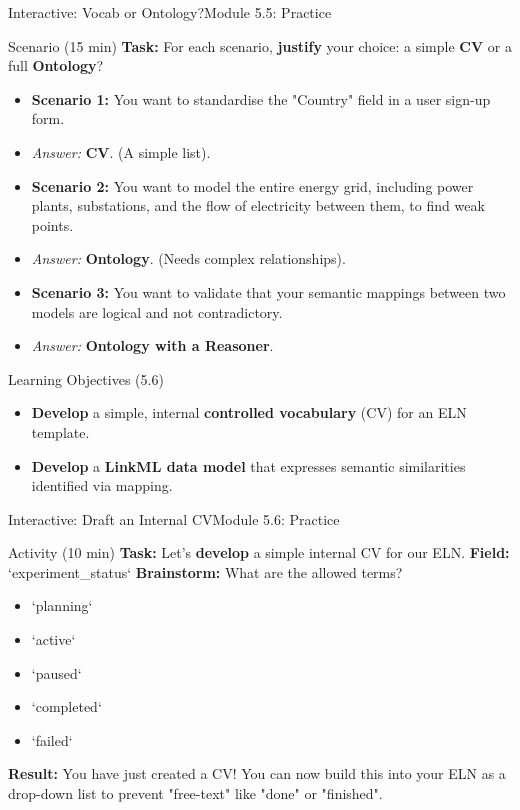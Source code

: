 \begin{frame}{Interactive: Vocab or Ontology?}{Module 5.5: Practice}
    \begin{block}{Scenario (15 min)}
        \textbf{Task:} For each scenario, \textbf{justify} your choice: a simple \textbf{CV} or a full \textbf{Ontology}?
        \pause
        \begin{itemize}
            \item \textbf{Scenario 1:} You want to standardise the "Country" field in a user sign-up form.
            \item \emph{Answer:} \textbf{CV}. (A simple list).
            \pause
            \item \textbf{Scenario 2:} You want to model the entire energy grid, including power plants, substations, and the flow of electricity between them, to find weak points.
            \item \emph{Answer:} \textbf{Ontology}. (Needs complex relationships).
            \pause
            \item \textbf{Scenario 3:} You want to validate that your semantic mappings between two models are logical and not contradictory.
            \item \emph{Answer:} \textbf{Ontology with a Reasoner}.
        \end{itemize}
    \end{block}
\end{frame}
\begin{frame}{Learning Objectives (5.6)}
    \begin{itemize}
        \item \textbf{Develop} a simple, internal \textbf{controlled vocabulary} (CV) for an ELN template.
        \item \textbf{Develop} a \textbf{LinkML data model} that expresses semantic similarities identified via mapping.
    \end{itemize}
\end{frame}

\begin{frame}{Interactive: Draft an Internal CV}{Module 5.6: Practice}
    \begin{block}{Activity (10 min)}
        \textbf{Task:} Let's \textbf{develop} a simple internal CV for our ELN.
        \pause
        \textbf{Field:} `experiment\_status`
        \pause
        \textbf{Brainstorm:} What are the allowed terms?
        \begin{itemize}
            \item `planning`
            \item `active`
            \item `paused`
            \item `completed`
            \item `failed`
        \end{itemize}
        \pause
        \textbf{Result:} You have just created a CV! You can now build this into your ELN as a drop-down list to prevent "free-text" like "done" or "finished".
    \end{block}
\end{frame}

